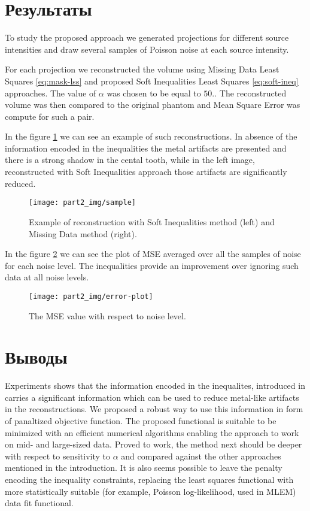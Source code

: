 \section{Результаты}
\label{s-results}
To study the proposed approach we generated projections for different source intensities and draw several samples of Poisson noise at each source intensity.

For each projection we reconstructed the volume using Missing Data Least Squares \eqref{eq:mask-lss} and proposed Soft Inequalities Least Squares \eqref{eq:soft-ineq} approaches. The value of $\alpha$ was chosen to be equal to $50$.. The reconstructed volume was then compared to the original phantom and Mean Square Error was compute for such a pair.

In the figure \ref{sample} we can see an example of such reconstructions. In absence of the information encoded in the inequalities the metal artifacts are presented and there is a strong shadow in the cental tooth, while in the left image, reconstructed with Soft Inequalities approach those artifacts are significantly reduced.
\begin{figure}
  \centering
  \texttt{[image: part2\_img/sample]}
  \caption{Example of reconstruction with Soft Inequalities method (left)
    and Missing Data method (right).}
  \label{sample}
\end{figure}
In the figure \ref{error-plot} we can see the plot of MSE averaged over all the samples of noise for each noise level. The inequalities provide an improvement over ignoring such data at all noise levels.
\begin{figure}
  \centering
  \texttt{[image: part2\_img/error-plot]}
  \caption{The MSE value with respect to noise level.}
  \label{error-plot}
\end{figure}

\section{Выводы}
\label{s-conclusion}

Experiments shows that the information encoded in the inequalites, introduced in \cite{chukalinaway} carries a significant information which can be used to reduce metal-like artifacts in the reconstructions. We proposed a robust way to use this information in form of panaltized objective function. The proposed functional is suitable to be minimized with an efficient numerical algorithms enabling the approach to work on mid- and large-sized data. Proved to work, the method next should be deeper with respect to sensitivity to $\alpha$ and compared against the other approaches mentioned in the introduction. It is also seems possible to leave the penalty encoding the inequality constraints, replacing the least squares functional with more statistically suitable (for example, Poisson log-likelihood, used in MLEM) data fit functional.

